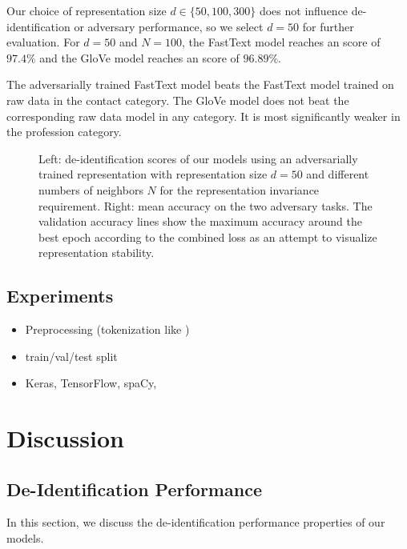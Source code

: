 %
Our choice of representation size $d \in \{50, 100, 300\}$ does not influence de-identifi\-ca\-tion or adversary performance, so we select $d=50$ for further evaluation.
%
For $d=50$ and $N=100$, the FastText model reaches an \fone score of $97.4\%$ and the GloVe model reaches an \fone score of $96.89\%$.

%
The adversarially trained FastText model beats the FastText model trained on raw data in the contact category. 
%
The GloVe model does not beat the corresponding raw data model in any category.
%
It is most significantly weaker in the profession category.

\begin{figure*}
    \centering
    
    \caption[De-identification with adversarially learned representations]{%
        Left: de-identification \fone scores of our models using an adversarially trained representation with representation size $d=50$ and different numbers of neighbors $N$ for the representation invariance requirement.
        Right: mean accuracy on the two adversary tasks.
        The validation accuracy lines show the maximum accuracy around the best epoch according to the combined loss as an attempt to visualize representation stability.
    }\label{fig:adversarial-deid}
\end{figure*}

\subsection{Experiments}
\begin{itemize}
    \item Preprocessing (tokenization like \citet{liu2017identification})
    \item train/val/test split
    \item Keras, TensorFlow, spaCy, 
\end{itemize}

\section{Discussion}\label{sec:discussion}

\subsection{De-Identification Performance}
%
In this section, we discuss the de-identification performance properties of our models.

